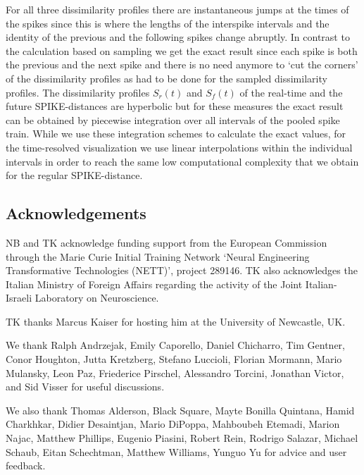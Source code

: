 \documentclass[10pt,twocolumn]{elsart5p}
\begin{document}
\begin{appendix}
For all three dissimilarity profiles there are instantaneous jumps at the times of the spikes since this is where the lengths of the interspike intervals and the identity of the previous and the following spikes change abruptly. In contrast to the calculation based on sampling we get the exact result since each spike is both the previous and the next spike and there is no need anymore to `cut the corners' of the dissimilarity profiles as had to be done for the sampled dissimilarity profiles. The dissimilarity profiles $S_r(t)$ and $S_f (t)$ of the real-time and the future SPIKE-distances are hyperbolic but for these measures the exact result can be obtained by piecewise integration over all intervals of the pooled spike train. While we use these integration schemes to calculate the exact values, for the time-resolved visualization we use linear interpolations within the individual intervals in order to reach the same low computational complexity that we obtain for the regular SPIKE-distance.

\end{appendix}

\vspace{1cm}

\begin{thanks}
\section{\label{s:Acknowledgement} \textbf{Acknowledgements}}

NB and TK acknowledge funding support from the European Commission through the Marie Curie Initial Training 	Network `Neural Engineering Transformative Technologies (NETT)', project 289146. TK also acknowledges the Italian Ministry of Foreign Affairs regarding the activity of the Joint Italian-Israeli Laboratory on Neuroscience.

TK thanks Marcus Kaiser for hosting him at the University of Newcastle, UK.
     
We thank Ralph Andrzejak, Emily Caporello, Daniel Chicharro, Tim Gentner, Conor Houghton, Jutta Kretzberg, Stefano Luccioli, Florian Mormann, Mario Mulansky, Leon Paz, Friederice Pirschel, Alessandro Torcini, Jonathan Victor, and Sid Visser for useful discussions.

We also thank Thomas Alderson, Black Square, Mayte Bonilla Quintana, Hamid Charkhkar, Didier Desaintjan, Mario DiPoppa, Mahboubeh Etemadi, Marion Najac, Matthew Phillips, Eugenio Piasini, Robert Rein, Rodrigo Salazar, Michael Schaub, Eitan Schechtman, Matthew Williams, Yunguo Yu for advice and user feedback.
\end{thanks}
\end{document}
